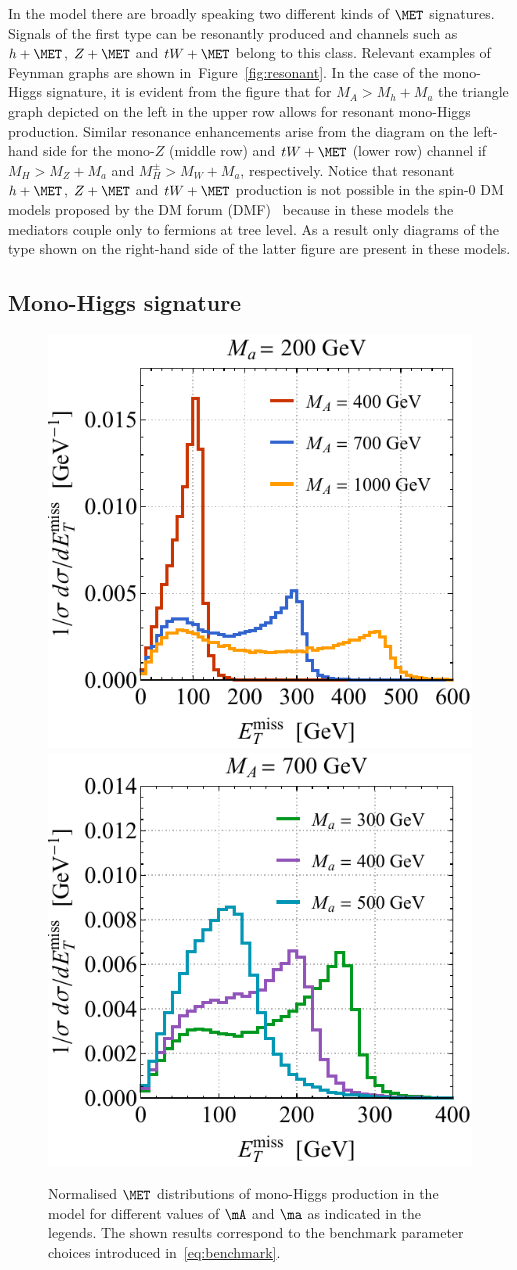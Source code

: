 In the   \hdma model there are broadly speaking two different kinds of $\MET$ signatures. Signals of the first type can be resonantly produced and  channels such as $h+\MET$, $Z+ \MET$ and $tW+\MET$ belong to this class. Relevant examples of Feynman graphs are shown in~Figure~\ref{fig:resonant}. In the case of the mono-Higgs signature, it is evident from the figure that for $M_A > M_h + M_a$ the triangle  graph depicted on the left in the upper row  allows for resonant mono-Higgs production.  Similar resonance enhancements arise from the diagram on the left-hand side for the mono-$Z$ (middle row) and $tW+\MET$ (lower row) channel if $M_H > M_Z + M_a$ and $M_H^\pm > M_W + M_a$, respectively. Notice that resonant $h+\MET$, $Z+\MET$ and $tW+\MET$ production is not possible in the spin-0  DM models proposed by the DM forum (DMF)~\cite{Abercrombie:2015wmb} because in these models the mediators couple only to fermions at tree level. As a result only diagrams of the type shown on the right-hand side of the latter figure are present in  these models. 

\subsection*{Mono-Higgs signature}

\begin{figure}[t!]
\centering
\includegraphics[height=0.45\textwidth]{texinputs/04_grid/newfigures/hmetspecl.pdf}	\qquad 
\includegraphics[height=0.45\textwidth]{texinputs/04_grid/newfigures/hmetspecr.pdf}
\vspace{2mm}
\caption{\label{fig:hMET} Normalised $\MET$ distributions of mono-Higgs production in the \hdma model for different values of $\mA$ and $\ma$ as indicated in the legends. The shown results correspond to the benchmark parameter choices introduced in~\eqref{eq:benchmark}. }  
\end{figure}

